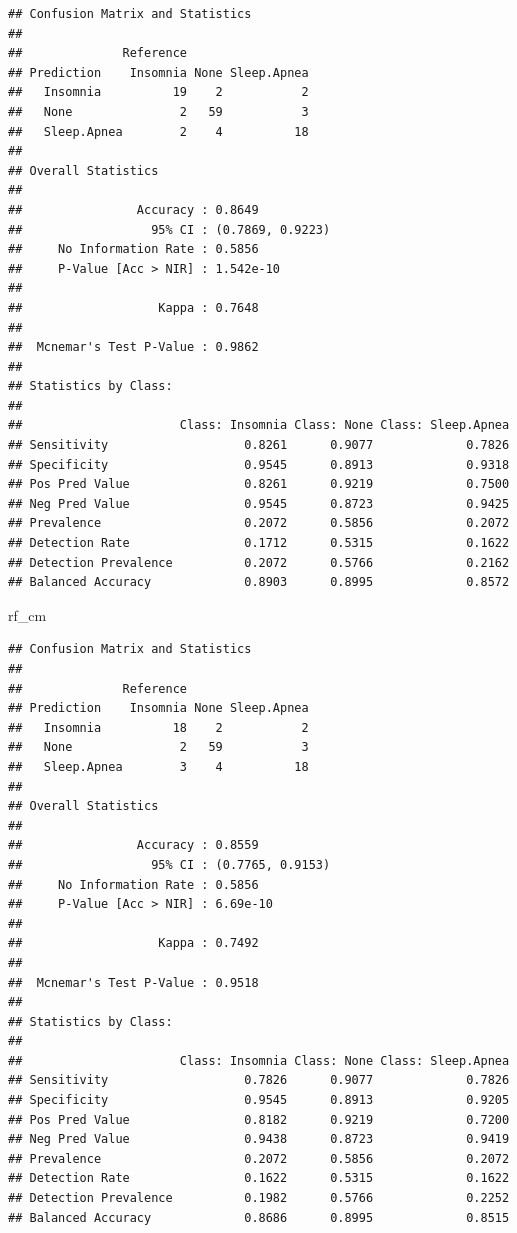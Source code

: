 \documentclass[
]{article}
\newenvironment{Shaded}{\begin{snugshade}}{\end{snugshade}}
\newcommand{\NormalTok}[1]{#1}
\begin{document}
\begin{verbatim}
## Confusion Matrix and Statistics
## 
##              Reference
## Prediction    Insomnia None Sleep.Apnea
##   Insomnia          19    2           2
##   None               2   59           3
##   Sleep.Apnea        2    4          18
## 
## Overall Statistics
##                                           
##                Accuracy : 0.8649          
##                  95% CI : (0.7869, 0.9223)
##     No Information Rate : 0.5856          
##     P-Value [Acc > NIR] : 1.542e-10       
##                                           
##                   Kappa : 0.7648          
##                                           
##  Mcnemar's Test P-Value : 0.9862          
## 
## Statistics by Class:
## 
##                      Class: Insomnia Class: None Class: Sleep.Apnea
## Sensitivity                   0.8261      0.9077             0.7826
## Specificity                   0.9545      0.8913             0.9318
## Pos Pred Value                0.8261      0.9219             0.7500
## Neg Pred Value                0.9545      0.8723             0.9425
## Prevalence                    0.2072      0.5856             0.2072
## Detection Rate                0.1712      0.5315             0.1622
## Detection Prevalence          0.2072      0.5766             0.2162
## Balanced Accuracy             0.8903      0.8995             0.8572
\end{verbatim}

\begin{Shaded}
\begin{Highlighting}[]
\NormalTok{rf\_cm}
\end{Highlighting}
\end{Shaded}

\begin{verbatim}
## Confusion Matrix and Statistics
## 
##              Reference
## Prediction    Insomnia None Sleep.Apnea
##   Insomnia          18    2           2
##   None               2   59           3
##   Sleep.Apnea        3    4          18
## 
## Overall Statistics
##                                           
##                Accuracy : 0.8559          
##                  95% CI : (0.7765, 0.9153)
##     No Information Rate : 0.5856          
##     P-Value [Acc > NIR] : 6.69e-10        
##                                           
##                   Kappa : 0.7492          
##                                           
##  Mcnemar's Test P-Value : 0.9518          
## 
## Statistics by Class:
## 
##                      Class: Insomnia Class: None Class: Sleep.Apnea
## Sensitivity                   0.7826      0.9077             0.7826
## Specificity                   0.9545      0.8913             0.9205
## Pos Pred Value                0.8182      0.9219             0.7200
## Neg Pred Value                0.9438      0.8723             0.9419
## Prevalence                    0.2072      0.5856             0.2072
## Detection Rate                0.1622      0.5315             0.1622
## Detection Prevalence          0.1982      0.5766             0.2252
## Balanced Accuracy             0.8686      0.8995             0.8515
\end{verbatim}
\end{document}
